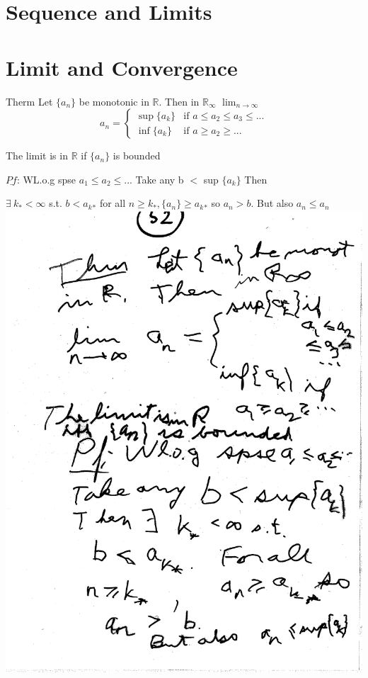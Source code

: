 \documentclass[10pt,a4paper]{article}
\begin{document}



\section{Sequence and Limits}



\section{Limit and Convergence}


Therm Let $\{ a_n \}$ be monotonic
in $\mathbb{R}$. Then in $\mathbb{R}_{\infty}$
$\lim_{n \rightarrow{\infty}}$
$$a_n = \begin{cases} 
\sup \{ a_k \} & \mbox{if } a \leq a_2 \leq a_3 \leq...\\
\inf \{ a_k \} & \mbox{if } a\geq a_2 \geq...
\end{cases}$$

The limit is in  $\mathbb{R}$ if $\{ a_n \}$ is bounded


$\underline{Pf}$: WL.o.g spse  $a_1 \leq a_2 \leq ...$ Take any b $<$ sup $\{ a_k \}$ Then 

$\exists\ k_* < \infty$ s.t. $b < a{_k{_*}}$ for all $n \geq k_* , \{ a_n \} \geq 
 a{_k{_*}}$ so $ a_n > b.$ But also $a_n \leq a_n$
\includegraphics[scale=.5]{Pages/LC_6} 
\end{document}
